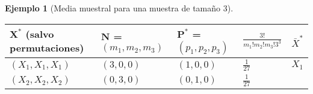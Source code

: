 \documentclass[
]{book}
\theoremstyle{break}
\theoremstyle{definition}
\theoremstyle{definition}
\newtheorem{example}{Ejemplo}[chapter]
\theoremstyle{definition}
\theoremstyle{remark}
\begin{document}
\begin{example}[Media muestral para una muestra de tamaño 3]
\begin{longtable}[]{@{}lllll@{}}
\toprule
\begin{minipage}[b]{0.18\columnwidth}\raggedright
\(\mathbf{X}^{\ast}\) (salvo permutaciones)\strut
\end{minipage} & \begin{minipage}[b]{0.16\columnwidth}\raggedright
\(\mathbf{N}\) = \(\left( m_1,m_2,m_3 \right)\)\strut
\end{minipage} & \begin{minipage}[b]{0.16\columnwidth}\raggedright
\(\mathbf{P}^{\ast}\) = \(\left(p_1,p_2,p_3 \right)\)\strut
\end{minipage} & \begin{minipage}[b]{0.17\columnwidth}\raggedright
\(\frac{3!}{m_1!m_2!m_3!3^{3}}\)\strut
\end{minipage} & \begin{minipage}[b]{0.18\columnwidth}\raggedright
\(\bar{X}^{\ast}\)\strut
\end{minipage}\tabularnewline
\midrule
\endhead
\begin{minipage}[t]{0.18\columnwidth}\raggedright
\(\left( X_1,X_1,X_1 \right)\)\strut
\end{minipage} & \begin{minipage}[t]{0.16\columnwidth}\raggedright
\(\left( 3,0,0 \right)\)\strut
\end{minipage} & \begin{minipage}[t]{0.16\columnwidth}\raggedright
\(\left(1,0,0 \right)\)\strut
\end{minipage} & \begin{minipage}[t]{0.17\columnwidth}\raggedright
\(\frac{1}{27}\)\strut
\end{minipage} & \begin{minipage}[t]{0.18\columnwidth}\raggedright
\(X_1\)\strut
\end{minipage}\tabularnewline
\begin{minipage}[t]{0.18\columnwidth}\raggedright
\(\left( X_2,X_2,X_2 \right)\)\strut
\end{minipage} & \begin{minipage}[t]{0.16\columnwidth}\raggedright
\(\left( 0,3,0 \right)\)\strut
\end{minipage} & \begin{minipage}[t]{0.16\columnwidth}\raggedright
\(\left(0,1,0 \right)\)\strut
\end{minipage} & \begin{minipage}[t]{0.17\columnwidth}\raggedright
\(\frac{1}{27}\)\strut

\end{minipage}
\end{longtable}
\end{example}
\end{document}
